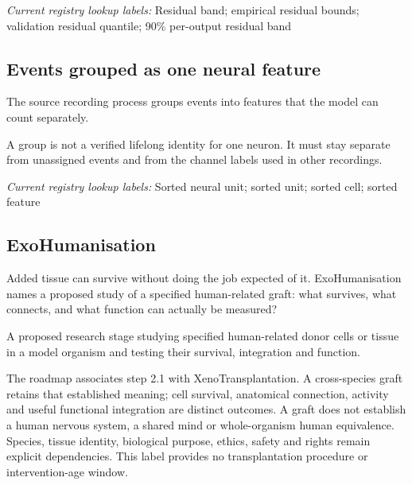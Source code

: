 \noindent\textit{Current registry lookup labels:} Residual band; empirical residual bounds; validation residual quantile; 90\% per-output residual band\par

\begin{samepage}
\subsection*{Events grouped as one neural feature}
\noindent The source recording process groups events into features that the model can count separately.\par
\end{samepage}
\begin{samepage}
\noindent A group is not a verified lifelong identity for one neuron. It must stay separate from unassigned events and from the channel labels used in other recordings.\par\nopagebreak[4]

\end{samepage}


\noindent\textit{Current registry lookup labels:} Sorted neural unit; sorted unit; sorted cell; sorted feature\par

\subsection*{ExoHumanisation}
\noindent Added tissue can survive without doing the job expected of it. ExoHumanisation names a proposed study of a specified human-related graft: what survives, what connects, and what function can actually be measured?\par
\noindent A proposed research stage studying specified human-related donor cells or tissue in a model organism and testing their survival, integration and function.\par
\noindent The roadmap associates step 2.1 with XenoTransplantation. A cross-species graft retains that established meaning; cell survival, anatomical connection, activity and useful functional integration are distinct outcomes. A graft does not establish a human nervous system, a shared mind or whole-organism human equivalence. Species, tissue identity, biological purpose, ethics, safety and rights remain explicit dependencies. This label provides no transplantation procedure or intervention-age window.\par

